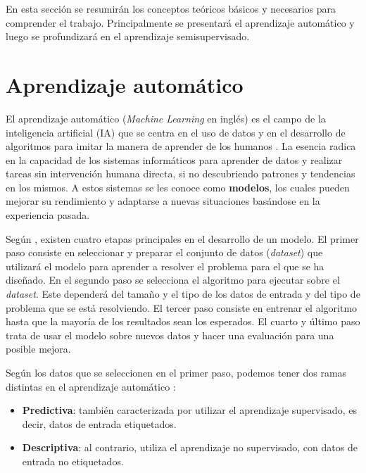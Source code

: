 
En esta sección se resumirán los conceptos teóricos básicos y necesarios para comprender el trabajo. Principalmente se presentará el aprendizaje automático y luego se profundizará en el aprendizaje semisupervisado.

\section{Aprendizaje automático}
El aprendizaje automático (\textit{Machine Learning} en inglés) es el campo de la inteligencia artificial (IA) que se centra en el uso de datos y en el desarrollo de algoritmos para imitar la manera de aprender de los humanos \cite{ML:ibm}. La esencia radica en la capacidad de los sistemas informáticos para aprender de datos y realizar tareas sin intervención humana directa, si no descubriendo patrones y tendencias en los mismos. A estos sistemas se les conoce como \textbf{modelos}, los cuales pueden mejorar su rendimiento y adaptarse a nuevas situaciones basándose en la experiencia pasada.

Según \cite{ML:DataScientest}, existen cuatro etapas principales en el desarrollo de un modelo. El primer paso consiste en seleccionar y preparar el conjunto de datos (\textit{dataset}) que utilizará el modelo para aprender a resolver el problema para el que se ha diseñado. En el segundo paso se selecciona el algoritmo para ejecutar sobre el \textit{dataset}. Este dependerá del tamaño y el tipo de los datos de entrada y del tipo de problema que se está resolviendo. El tercer paso consiste en entrenar el algoritmo hasta que la mayoría de los resultados sean los esperados. El cuarto y último paso trata de usar el modelo sobre nuevos datos y hacer una evaluación para una posible mejora.

Según los datos que se seleccionen en el primer paso, podemos tener dos ramas distintas en el aprendizaje automático \cite{ML:SisInt}:
\begin{itemize}
	\item \textbf{Predictiva}: también caracterizada por utilizar el aprendizaje supervisado, es decir, datos de entrada etiquetados.
	\item \textbf{Descriptiva}: al contrario, utiliza el aprendizaje no supervisado, con datos de entrada no etiquetados.
\end{itemize}

 

